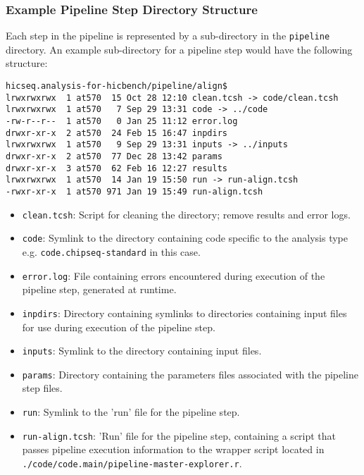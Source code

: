 \subsubsection{Example Pipeline Step Directory Structure}
Each step in the pipeline is represented by a sub-directory in the \texttt{pipeline} directory. An example sub-directory for a pipeline step would have the following structure:

\begin{lstlisting}
hicseq.analysis-for-hicbench/pipeline/align$
lrwxrwxrwx  1 at570  15 Oct 28 12:10 clean.tcsh -> code/clean.tcsh
lrwxrwxrwx  1 at570   7 Sep 29 13:31 code -> ../code
-rw-r--r--  1 at570   0 Jan 25 11:12 error.log
drwxr-xr-x  2 at570  24 Feb 15 16:47 inpdirs
lrwxrwxrwx  1 at570   9 Sep 29 13:31 inputs -> ../inputs
drwxr-xr-x  2 at570  77 Dec 28 13:42 params
drwxr-xr-x  3 at570  62 Feb 16 12:27 results
lrwxrwxrwx  1 at570  14 Jan 19 15:50 run -> run-align.tcsh
-rwxr-xr-x  1 at570 971 Jan 19 15:49 run-align.tcsh
\end{lstlisting}

\begin{itemize}
\item \texttt{clean.tcsh}: Script for cleaning the directory; remove results and error logs.
\item \texttt{code}: Symlink to the directory containing code specific to the analysis type e.g. \texttt{code.chipseq-standard} in this case.
\item \texttt{error.log}: File containing errors encountered during execution of the pipeline step, generated at runtime.
\item \texttt{inpdirs}: Directory containing symlinks to directories containing input files for use during execution of the pipeline step.
\item \texttt{inputs}: Symlink to the directory containing input files.
\item \texttt{params}: Directory containing the parameters files associated with the pipeline step files. 
\item \texttt{run}: Symlink to the 'run' file for the pipeline step.
\item \texttt{run-align.tcsh}: 'Run' file for the pipeline step, containing a script that passes pipeline execution information to the wrapper script located in \texttt{./code/code.main/pipeline-master-explorer.r}. 
\end{itemize}
